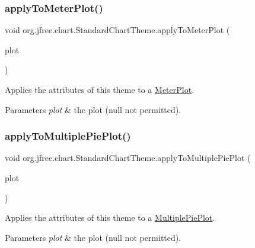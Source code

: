 \subsubsection{\texorpdfstring{apply\+To\+Meter\+Plot()}{applyToMeterPlot()}}
{\footnotesize\ttfamily void org.\+jfree.\+chart.\+Standard\+Chart\+Theme.\+apply\+To\+Meter\+Plot (\begin{DoxyParamCaption}\item[{\mbox{\hyperlink{classorg_1_1jfree_1_1chart_1_1plot_1_1_meter_plot}{Meter\+Plot}}}]{plot }\end{DoxyParamCaption})\hspace{0.3cm}{\ttfamily [protected]}}

Applies the attributes of this theme to a \mbox{\hyperlink{}{Meter\+Plot}}.


\begin{DoxyParams}{Parameters}
{\em plot} & the plot ({\ttfamily null} not permitted). \\
\hline
\end{DoxyParams}
\mbox{\label{classorg_1_1jfree_1_1chart_1_1_standard_chart_theme_abf8893c8269cd2f2c6ce15b506b45e24}} 
\subsubsection{\texorpdfstring{apply\+To\+Multiple\+Pie\+Plot()}{applyToMultiplePiePlot()}}
{\footnotesize\ttfamily void org.\+jfree.\+chart.\+Standard\+Chart\+Theme.\+apply\+To\+Multiple\+Pie\+Plot (\begin{DoxyParamCaption}\item[{\mbox{\hyperlink{classorg_1_1jfree_1_1chart_1_1plot_1_1_multiple_pie_plot}{Multiple\+Pie\+Plot}}}]{plot }\end{DoxyParamCaption})\hspace{0.3cm}{\ttfamily [protected]}}

Applies the attributes of this theme to a \mbox{\hyperlink{}{Multiple\+Pie\+Plot}}.


\begin{DoxyParams}{Parameters}
{\em plot} & the plot ({\ttfamily null} not permitted). \\
\hline
\end{DoxyParams}
\mbox{\label{classorg_1_1jfree_1_1chart_1_1_standard_chart_theme_ad5633c7b4317d17c2fbcd031021a8694}} 
